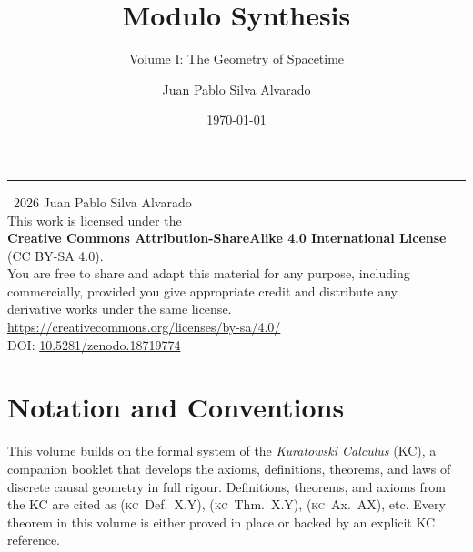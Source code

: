 \documentclass[11pt, a4paper, openany]{book}
\title{Modulo Synthesis}
\subtitle{Volume I: The Geometry of Spacetime}
\author{Juan Pablo Silva Alvarado}
\date{\today}
\makeatletter
\newcommand{\KC}[1]{\textnormal{(\textsc{kc}~#1)}}
\gdef\@subtitle{}\gdef\@extrainfo{}
\renewcommand{\maketitle}{%
  \begin{titlepage}\centering
    \vspace*{4cm}
    {\Huge\bfseries\color{structure}\@title\par}\vspace{0.6cm}
    \ifx\@subtitle\empty\else{\Large\color{gray!80}\@subtitle\par}\fi
    \vspace{2cm}
    {\color{main}\rule{0.6\textwidth}{2pt}\par}\vspace{2cm}
    {\LARGE\@author\par}\vspace{1cm}
    {\large\@date\par}\vfill
    \ifx\@extrainfo\empty\else
      \begin{minipage}{0.8\textwidth}\centering\itshape\color{gray!60}\@extrainfo\end{minipage}\vspace{3cm}
    \fi
  \end{titlepage}
}
\makeatother
\begin{document}
\maketitle

\thispagestyle{empty}
\vspace*{\fill}
\begin{center}
\textcopyright\ 2026 Juan Pablo Silva Alvarado\\[1em]
This work is licensed under the\\[4pt]
{\bfseries Creative Commons Attribution-ShareAlike 4.0 International License}\\[4pt]
(CC BY-SA 4.0).\\[1em]
You are free to share and adapt this material for any purpose, including\\
commercially, provided you give appropriate credit and distribute any\\
derivative works under the same license.\\[1em]
\url{https://creativecommons.org/licenses/by-sa/4.0/}\\[2em]
{\small DOI: \href{https://doi.org/10.5281/zenodo.18719774}{10.5281/zenodo.18719774}}
\end{center}
\vspace*{\fill}
\clearpage

\frontmatter
\tableofcontents

\chapter*{Notation and Conventions}

This volume builds on the formal system of the \textit{Kuratowski Calculus} (KC), a companion booklet that develops the axioms, definitions, theorems, and laws of discrete causal geometry in full rigour. Definitions, theorems, and axioms from the KC are cited as \KC{Def.~X.Y}, \KC{Thm.~X.Y}, \KC{Ax.~AX}, etc. Every theorem in this volume is either proved in place or backed by an explicit KC reference.
\end{document}

